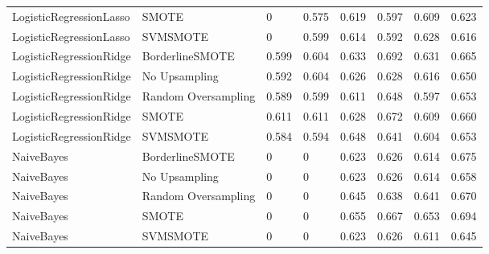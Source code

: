 \begin{tabular}{llllllll}
     LogisticRegressionLasso &               SMOTE &     0 &                     0.575 &                 0.619 &                  0.597 &                                   0.609 &    0.623 \\
     LogisticRegressionLasso &            SVMSMOTE &     0 &                     0.599 &                 0.614 &                  0.592 &                                   0.628 &    0.616 \\
     LogisticRegressionRidge &     BorderlineSMOTE & 0.599 &                     0.604 &                 0.633 &                  0.692 &                                   0.631 &    0.665 \\
     LogisticRegressionRidge &       No Upsampling & 0.592 &                     0.604 &                 0.626 &                  0.628 &                                   0.616 &    0.650 \\
     LogisticRegressionRidge & Random Oversampling & 0.589 &                     0.599 &                 0.611 &                  0.648 &                                   0.597 &    0.653 \\
     LogisticRegressionRidge &               SMOTE & 0.611 &                     0.611 &                 0.628 &                  0.672 &                                   0.609 &    0.660 \\
     LogisticRegressionRidge &            SVMSMOTE & 0.584 &                     0.594 &                 0.648 &                  0.641 &                                   0.604 &    0.653 \\
                  NaiveBayes &     BorderlineSMOTE &     0 &                         0 &                 0.623 &                  0.626 &                                   0.614 &    0.675 \\
                  NaiveBayes &       No Upsampling &     0 &                         0 &                 0.623 &                  0.626 &                                   0.614 &    0.658 \\
                  NaiveBayes & Random Oversampling &     0 &                         0 &                 0.645 &                  0.638 &                                   0.641 &    0.670 \\
                  NaiveBayes &               SMOTE &     0 &                         0 &                 0.655 &                  0.667 &                                   0.653 &    0.694 \\
                  NaiveBayes &            SVMSMOTE &     0 &                         0 &                 0.623 &                  0.626 &                                   0.611 &    0.645 \\

\end{tabular}
